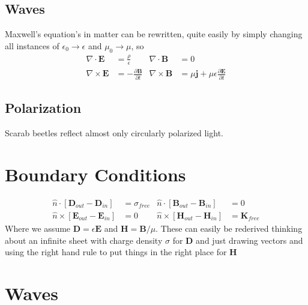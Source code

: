 \subsection{Waves}
Maxwell's equation's in matter can be rewritten, quite easily by simply changing all instances of $\epsilon_0 \rightarrow \epsilon$ and $\mu_0 \rightarrow \mu$, so
\begin{align}
\nabla\cdot\textbf{E} &= \frac{\rho}{\epsilon} & \nabla\cdot\textbf{B} &= 0\\
\nabla\times\textbf{E} &= -\frac{\partial\textbf{B}}{\partial t} &\nabla\times\textbf{B} &= \mu\textbf{j} + \mu\epsilon\frac{\partial\textbf{E}}{\partial t} 
\end{align}



\subsection{Polarization}
Scarab beetles reflect almost only circularly polarized light.



\section{Boundary Conditions}
\begin{align}
\hat{n}\cdot[\textbf{D}_{out} - \textbf{D}_{in}] &= \sigma_{free} &\hat{n}\cdot[\textbf{B}_{out} - \textbf{B}_{in}] &= 0\\
\hat{n}\times[\textbf{E}_{out} - \textbf{E}_{in}] &= 0 &\hat{n}\times[\textbf{H}_{out}-\textbf{H}_{in}] &= \textbf{K}_{free}
\end{align}
Where we assume $\textbf{D} = \epsilon\textbf{E}$ and $\textbf{H} = \textbf{B}/\mu$. These can easily be rederived thinking about an infinite sheet with charge density $\sigma$ for $\textbf{D}$ and just drawing vectors and using the right hand rule to put things in the right place for $\textbf{H}$

\section{Waves}
